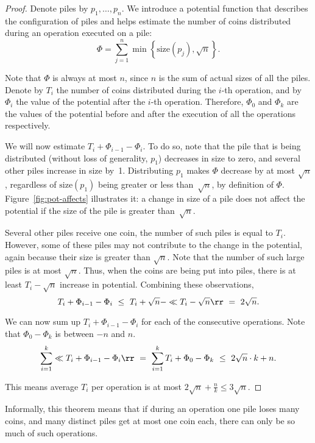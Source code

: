\documentclass[a4paper,11pt]{article}
\begin{document}
\begin{proof} Denote piles by $p_1, \ldots, p_n$. We introduce a potential function that describes the configuration of piles and helps estimate the number of coins distributed during an operation executed on a pile:
	\[ \Phi = \sum\limits_{j=1}^n \min \left\{ \text{size}(p_j), \sqrt{n} \right\}. \]

Note that $\Phi$ is always at most $n$, since $n$ is the sum of actual sizes of all the piles. Denote by $T_i$ the number of coins distributed during the $i$-th operation, and by $\Phi_i$ the value of the potential after the $i$-th operation. Therefore, $\Phi_{0}$ and $\Phi_{k}$ are the values of the potential before and after the execution of all the operations respectively.

We will now estimate $T_i + \Phi_{i-1} - \Phi_i$. To do so, note that the pile that is being distributed (without loss of generality, $p_1$) decreases in size to zero, and several other piles increase in size by~1. Distributing $p_1$ makes $\Phi$ decrease by at most $\sqrt{n}$, regardless of $\text{size} (p_1)$ being greater or less than~$\sqrt{n}$, by definition of $\Phi$. Figure~\ref{fig:pot-affects} illustrates it: a change in size of a pile does not affect the potential if the size of the pile is greater than~$\sqrt{n}$.



Several other piles receive one coin, the number of such piles is equal to $T_i$. However, some of these piles may not contribute to the change in the potential, again because their size is greater than $\sqrt{n}$. Note that the number of such large piles is at most $\sqrt{n}$. Thus, when the coins are being put into piles, there is at least $T_i - \sqrt{n}$ increase in potential. Combining these observations,
	\[ T_i + \Phi_{i-1} - \Phi_i\ \le\ 
	   T_i + \sqrt{n} - \ll T_i - \sqrt{n} \rr\ =\ 2 \sqrt{n}. \]

We can now sum up $T_i + \Phi_{i-1} - \Phi_i$ for each of the consecutive operations. Note that $\Phi_0 - \Phi_k$ is between $-n$ and $n$.
	\[ \sum\limits_{i=1}^k \ll T_i + \Phi_{i-1} - \Phi_i \rr\ =\ 
	   \sum\limits_{i=1}^k T_i + \Phi_0 - \Phi_{k}\ \le\ 2\sqrt{n} \cdot k + n. \]

This means average $T_i$ per operation is at most $2\sqrt{n} + \frac{n}{k} \le 3\sqrt{n}$. \end{proof}

Informally, this theorem means that if during an operation one pile
loses many coins, and many distinct piles get at most one coin each,
there can only be so much of such operations.
\end{document}
